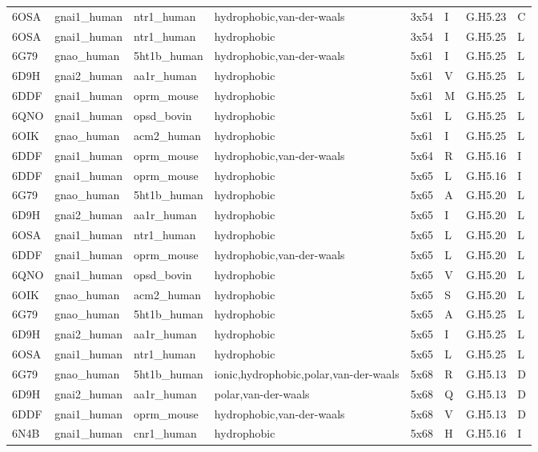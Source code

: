 \begin{landscape}
\begin{longtable}{llllllll}
6OSA & gnai1\_human & ntr1\_human & hydrophobic,van-der-waals & 3x54 & I & G.H5.23 & C\\
6OSA & gnai1\_human & ntr1\_human & hydrophobic & 3x54 & I & G.H5.25 & L\\
6G79 & gnao\_human & 5ht1b\_human & hydrophobic,van-der-waals & 5x61 & I & G.H5.25 & L\\
6D9H & gnai2\_human & aa1r\_human & hydrophobic & 5x61 & V & G.H5.25 & L\\
\addlinespace
6DDF & gnai1\_human & oprm\_mouse & hydrophobic & 5x61 & M & G.H5.25 & L\\
6QNO & gnai1\_human & opsd\_bovin & hydrophobic & 5x61 & L & G.H5.25 & L\\
6OIK & gnao\_human & acm2\_human & hydrophobic & 5x61 & I & G.H5.25 & L\\
6DDF & gnai1\_human & oprm\_mouse & hydrophobic,van-der-waals & 5x64 & R & G.H5.16 & I\\
6DDF & gnai1\_human & oprm\_mouse & hydrophobic & 5x65 & L & G.H5.16 & I\\
\addlinespace
6G79 & gnao\_human & 5ht1b\_human & hydrophobic & 5x65 & A & G.H5.20 & L\\
6D9H & gnai2\_human & aa1r\_human & hydrophobic & 5x65 & I & G.H5.20 & L\\
6OSA & gnai1\_human & ntr1\_human & hydrophobic & 5x65 & L & G.H5.20 & L\\
6DDF & gnai1\_human & oprm\_mouse & hydrophobic,van-der-waals & 5x65 & L & G.H5.20 & L\\
6QNO & gnai1\_human & opsd\_bovin & hydrophobic & 5x65 & V & G.H5.20 & L\\
\addlinespace
6OIK & gnao\_human & acm2\_human & hydrophobic & 5x65 & S & G.H5.20 & L\\
6G79 & gnao\_human & 5ht1b\_human & hydrophobic & 5x65 & A & G.H5.25 & L\\
6D9H & gnai2\_human & aa1r\_human & hydrophobic & 5x65 & I & G.H5.25 & L\\
6OSA & gnai1\_human & ntr1\_human & hydrophobic & 5x65 & L & G.H5.25 & L\\
6G79 & gnao\_human & 5ht1b\_human & ionic,hydrophobic,polar,van-der-waals & 5x68 & R & G.H5.13 & D\\
\addlinespace
6D9H & gnai2\_human & aa1r\_human & polar,van-der-waals & 5x68 & Q & G.H5.13 & D\\
6DDF & gnai1\_human & oprm\_mouse & hydrophobic,van-der-waals & 5x68 & V & G.H5.13 & D\\
6N4B & gnai1\_human & cnr1\_human & hydrophobic & 5x68 & H & G.H5.16 & I\\

\end{longtable}
\end{landscape}
